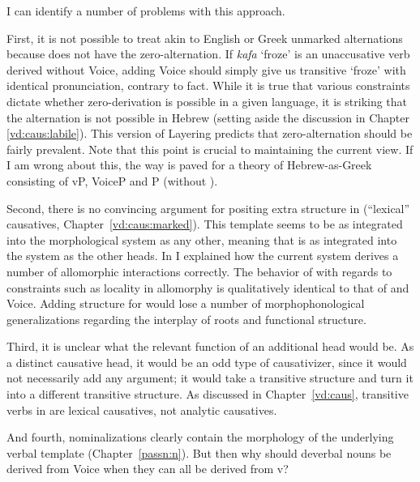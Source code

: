 I can identify a number of problems with this approach.

First, it is not possible to treat {\tkal} akin to English or Greek unmarked alternations because {\tkal} does not have the zero-alternation. If \emph{kafa} `froze' is an unaccusative verb derived without Voice, adding Voice should simply give us transitive `froze' with identical pronunciation, contrary to fact. While it is true that various constraints dictate whether zero-derivation is possible in a given language, it is striking that the alternation is not possible in Hebrew (setting aside the discussion in Chapter \ref{vd:caus:labile}). This version of Layering predicts that zero-alternation should be fairly prevalent. Note that this point is crucial to maintaining the current view. If I am wrong about this, the way is paved for a theory of Hebrew-as-Greek consisting of vP, VoiceP and {\vz}P (without {\vd}).

Second, there is no convincing argument for positing extra structure in {\thif} (``lexical'' causatives, Chapter~\ref{vd:caus:marked}). This template seems to be as integrated into the morphological system as any other, meaning that {\vd} is as integrated into the system as the other heads. In \cite{kastner18nllt} I explained how the current system derives a number of allomorphic interactions correctly. The behavior of {\vd} with regards to constraints such as locality in allomorphy is qualitatively identical to that of {\vz} and Voice. Adding structure for {\thif} would lose a number of morphophonological generalizations regarding the interplay of roots and functional structure.

Third, it is unclear what the relevant function of an additional head would be. As a  distinct causative head, it would be an odd type of causativizer, since it would not necessarily add any argument; it would take a transitive structure and turn it into a different transitive structure. As discussed in Chapter~\ref{vd:caus}, transitive verbs in {\thif} are lexical causatives, not analytic causatives.

And fourth, nominalizations clearly contain the morphology of the underlying verbal template (Chapter~\ref{passn:n}). But then why should deverbal nouns be derived from Voice when they can all be derived from v?

